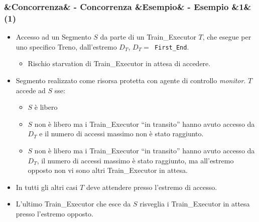 \documentclass[slidestop,compress,blackandwhite]{beamer}
\newcommand{\ttt}[1]{\texttt{#1}}
\newcommand{\ii}[1]{\textit{#1}}
\newcommand{\cm}[1]{\vspace{#1cm}}
\newcommand{\newtitle}[4]{
	#1 
	\ifx&#2&%
	\else
  		\large- #2
	\fi
	\ifx&#3&%
	\else
  		\small- #3
	\fi
	\ifx&#4&%
	\else
  		\normalsize (#4)
	\fi
}
\newcommand{\newframe}[5]{
	\begin{frame}
		\frametitle{\newtitle{#1}{#2}{#3}{#4}}
		#5
	\end{frame}
}
\newcommand{\myitemize}[1]{
	\begin{itemize}\itemsep4pt
	#1
	\end{itemize}
}
\begin{document}
	\newframe{}{Concorrenza}{Esempio}{1}{
		\cm{-0.1}
		\footnotesize
		\myitemize {
			\item Accesso ad un Segmento $S$ da parte di un Train\_Executor $T$, che esegue per uno specifico Treno, dall'estremo $D_T$, $D_T=$\ttt{ First\_End}.
				\myitemize {
					\item \footnotesize Rischio starvation di Train\_Executor in attesa di accedere.
				}
			\item Segmento realizzato come risorsa protetta con agente di controllo \ii{monitor}. $T$ accede ad $S$ sse:
				\myitemize{
					\item \footnotesize $S$ è libero
					\item $S$ non è libero ma i Train\_Executor ``in transito'' hanno avuto accesso da $D_T$ e il numero di accessi massimo non è stato raggiunto.
					\item $S$ non è libero ma i Train\_Executor ``in transito'' hanno avuto accesso da $D_T$, il numero di accessi massimo è stato raggiunto, ma all'estremo opposto non vi sono altri Train\_Executor in attesa.
				}
			\item In tutti gli altri casi $T$ deve attendere presso l'estremo di accesso.
			\item L'ultimo Train\_Executor che esce da $S$ risveglia i Train\_Executor in attesa presso l'estremo opposto.
		}	
	}
	
\end{document}
